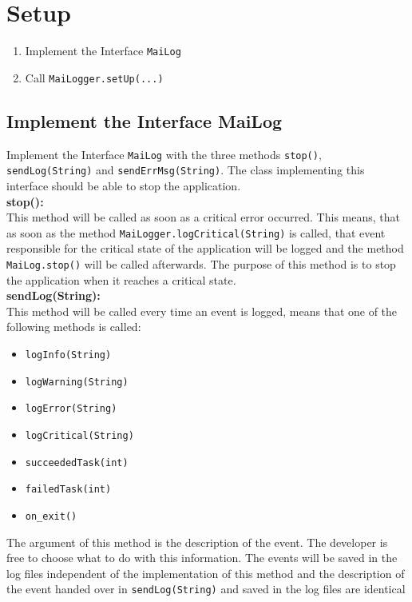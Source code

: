 \documentclass{article}
\begin{document}
\pagebreak
\section{Setup}
\label{setup}
    \begin{enumerate}
        \item Implement the Interface \lstinline|MaiLog|
        \item Call \lstinline|MaiLogger.setUp(...)|
    \end{enumerate}

    \subsection{Implement the Interface MaiLog}
    \label{setup_interface}
    Implement the Interface \lstinline|MaiLog| with the three methods \lstinline|stop()|, \lstinline|sendLog(String)| and \lstinline|sendErrMsg(String)|.
    The class implementing this interface should be able to stop the application. \\

    \textbf{stop():} \\
    This method will be called as soon as a critical error occurred.
    This means, that as soon as the method \lstinline|MaiLogger.logCritical(String)| is called, that event responsible for the critical state of the application will be logged and the method \lstinline|MaiLog.stop()| will be called afterwards.
    The purpose of this method is to stop the application when it reaches a critical state. \\

    \textbf{sendLog(String):} \\
    This method will be called every time an event is logged, means that one of the following methods is called:
    \begin{itemize}
        \item \lstinline|logInfo(String)|
        \item \lstinline|logWarning(String)|
        \item \lstinline|logError(String)|
        \item \lstinline|logCritical(String)|
        \item \lstinline|succeededTask(int)|
        \item \lstinline|failedTask(int)|
        \item \lstinline|on_exit()|
    \end{itemize}
    The argument of this method is the description of the event.
    The developer is free to choose what to do with this information.
    The events will be saved in the log files independent of the implementation of this method and the description of the event handed over in \lstinline|sendLog(String)| and saved in the log files are identical \\
\end{document}
